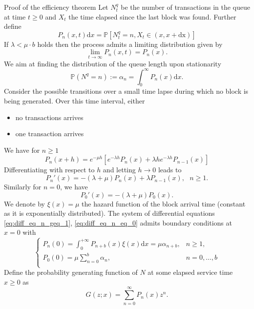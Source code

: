 \documentclass{beamer}
\begin{document}
\begin{frame}[allowframebreaks]{Proof of the efficiency theorem}
\scriptsize
Let $N^q_t$ be the number of transactions in the queue at time $t\geq0$ and $X_t$ the time elapsed since the last block was found. Further define
\[
P_{n}(x,t)\text{d}x  =\mathbb{P}[N_t^q = n, X_t \in(x, x + \text{dx})] 
\]
If $\lambda < \mu\cdot b$ holds then the process admits a limiting distribution given by 
\[
\underset{t\rightarrow\infty}{\lim}P_{n}(x,t) = P_{n}(x).
\]
We aim at finding the distribution of the queue length upon stationarity
\begin{equation}\label{eq:alpha_n}
\mathbb{P}(N^q=n):=\alpha_n =\int_{0}^\infty P_{n}(x)\text{d}x.
\end{equation}
Consider the possible transitions over a small time lapse  during which no block is being generated. Over this time interval, either 
\begin{itemize}
  \item no transactions arrives
  \item one transaction arrives
\end{itemize}
We have for $n\geq1$
\[
P_{n}(x+h) = e^{-\mu h}\left[e^{-\lambda h}P_{n}(x)+\lambda h e^{-\lambda h}P_{n-1}(x)\right]
\]
Differentiating with respect to $h$ and letting $h\rightarrow0$ leads to 
\begin{equation}\label{eq:diff_eq_n_geq_1}
P_{n}'(x) = -(\lambda+\mu)P_{n}(x)+\lambda P_{n-1}(x),\text{ }n \geq1.
\end{equation}
Similarly for $n = 0$, we have 
\begin{equation}\label{eq:diff_eq_n_eq_0}
P_{0}'(x) = -(\lambda+\mu)P_{0}(x).
\end{equation}
We denote by $\xi(x) = \mu$ the hazard function of the block arrival time (constant as it is exponentially distributed). The system of differential equations \eqref{eq:diff_eq_n_geq_1}, \eqref{eq:diff_eq_n_eq_0} admits boundary conditions at $x = 0$ with 
\begin{equation}\label{eq:boundary_cond_1}
\begin{cases}
P_{n}(0) = \int_0^{+\infty} P_{n+b}(x)\xi(x)\text{d}x = \mu\alpha_{n+b},&n \geq1,\\
P_{0}(0) = \mu\sum_{n=0}^{b}\alpha_n,&n = 0,\ldots,b\\
\end{cases}
\end{equation}
Define the probability generating function of $N$ at some elapsed service time $x\geq 0$ as 
$$
G(z;x) = \sum_{n=0}^\infty P_{n}(x)z^n.
$$
\end{frame}
\end{document}

